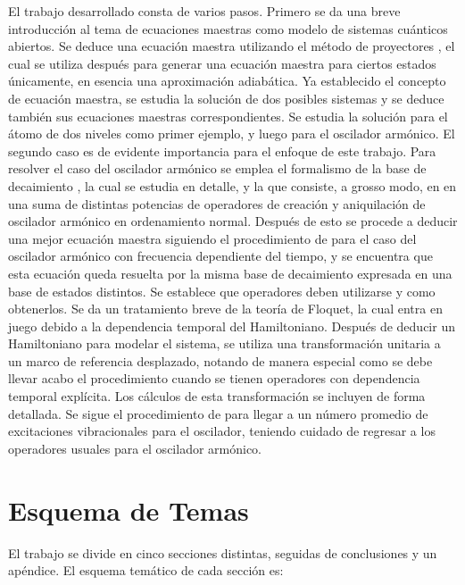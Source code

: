 \documentclass[a4paper,10pt]{report}
\begin{document}
El trabajo desarrollado consta de varios pasos. Primero se da una breve introducción al tema de ecuaciones maestras como modelo de sistemas cuánticos abiertos. Se deduce una ecuación maestra utilizando el método de proyectores \cite{ZollerQN}, el cual se utiliza después para generar una ecuación maestra para ciertos estados únicamente, en esencia una aproximación adiabática. Ya establecido el concepto de ecuación maestra, se estudia la solución de dos posibles sistemas y se deduce también sus ecuaciones maestras correspondientes. Se estudia la solución para el átomo de dos niveles como primer ejemplo, y luego para el oscilador armónico. El segundo caso es de evidente importancia para el enfoque de este trabajo. Para resolver el caso del oscilador armónico se emplea el formalismo de la base de decaimiento \cite{EnglertDB}, la cual se estudia en detalle, y la que consiste, a grosso modo, en en una suma de distintas potencias de operadores de creación y aniquilación de oscilador armónico en ordenamiento normal. Después de esto se procede a deducir una mejor ecuación maestra siguiendo el procedimiento de \cite{HanngiFM} para el caso del oscilador armónico con frecuencia dependiente del tiempo, y se encuentra que esta ecuación queda resuelta por la misma base de decaimiento expresada en una base de estados distintos. Se establece que operadores deben utilizarse y como obtenerlos. Se da un tratamiento breve de la teoría de Floquet, la cual entra en juego debido a la dependencia temporal del Hamiltoniano. Después de deducir un Hamiltoniano para modelar el sistema, se utiliza una transformación unitaria a un marco de referencia desplazado, notando de manera especial como se debe llevar acabo el procedimiento cuando se tienen operadores con dependencia temporal explícita. Los cálculos de esta transformación se incluyen de forma detallada. Se sigue el procedimiento de \cite{BarberisLC} para llegar a un número promedio de excitaciones vibracionales para el oscilador, teniendo cuidado de regresar a los operadores usuales para el oscilador armónico. 

\section{Esquema de Temas}

El trabajo se divide en cinco secciones distintas, seguidas de conclusiones y un apéndice. El esquema temático de cada sección es:
\end{document}

